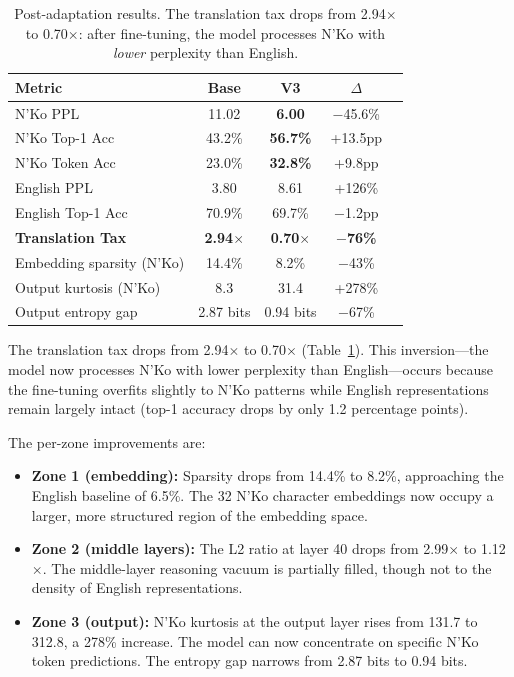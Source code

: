 \documentclass[11pt]{article}
\begin{document}
\begin{table}[t]
\centering
\small
\begin{tabular}{lcccc}
\toprule
\textbf{Metric} & \textbf{Base} & \textbf{V3} & \textbf{$\Delta$} \\
\midrule
N'Ko PPL & 11.02 & \textbf{6.00} & $-$45.6\% \\
N'Ko Top-1 Acc & 43.2\% & \textbf{56.7\%} & +13.5pp \\
N'Ko Token Acc & 23.0\% & \textbf{32.8\%} & +9.8pp \\
\midrule
English PPL & 3.80 & 8.61 & +126\% \\
English Top-1 Acc & 70.9\% & 69.7\% & $-$1.2pp \\
\midrule
\textbf{Translation Tax} & \textbf{2.94$\times$} & \textbf{0.70$\times$} & \textbf{$-$76\%} \\
\midrule
Embedding sparsity (N'Ko) & 14.4\% & 8.2\% & $-$43\% \\
Output kurtosis (N'Ko) & 8.3 & 31.4 & +278\% \\
Output entropy gap & 2.87 bits & 0.94 bits & $-$67\% \\
\bottomrule
\end{tabular}
\caption{Post-adaptation results. The translation tax drops from 2.94$\times$ to 0.70$\times$: after fine-tuning, the model processes N'Ko with \emph{lower} perplexity than English.}
\label{tab:main-results}
\end{table}

The translation tax drops from 2.94$\times$ to 0.70$\times$ (Table~\ref{tab:main-results}).
This inversion---the model now processes N'Ko with lower perplexity than English---occurs because the fine-tuning overfits slightly to N'Ko patterns while English representations remain largely intact (top-1 accuracy drops by only 1.2 percentage points).

The per-zone improvements are:
\begin{itemize}
\item \textbf{Zone 1 (embedding):} Sparsity drops from 14.4\% to 8.2\%, approaching the English baseline of 6.5\%. The 32 N'Ko character embeddings now occupy a larger, more structured region of the embedding space.
\item \textbf{Zone 2 (middle layers):} The L2 ratio at layer 40 drops from 2.99$\times$ to 1.12$\times$. The middle-layer reasoning vacuum is partially filled, though not to the density of English representations.
\item \textbf{Zone 3 (output):} N'Ko kurtosis at the output layer rises from 131.7 to 312.8, a 278\% increase. The model can now concentrate on specific N'Ko token predictions. The entropy gap narrows from 2.87 bits to 0.94 bits.
\end{itemize}
\end{document}
